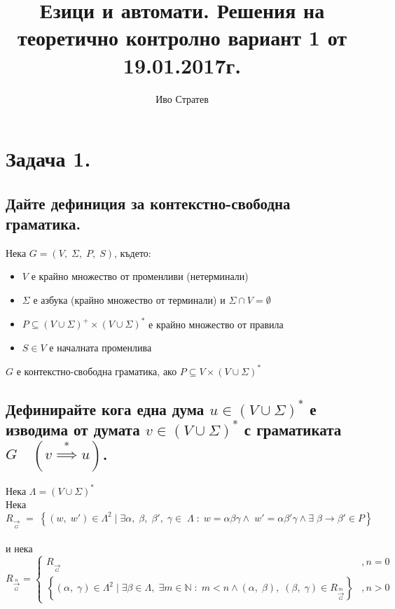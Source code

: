 \documentclass[12pt]{article}
\title{Езици и автомати. Решения на теоретично контролно вариант 1 от 19.01.2017г.}
\author{Иво Стратев}
\newcommand{\N}{\mathbb{N}}
\begin{document}
\maketitle
\section{Задача 1.}

\subsection{Дайте дефиниция за контекстно-свободна граматика.}

Нека $G = (V, \; \Sigma, \; P, \; S)$, където: \\

\begin{itemize}
    \item $V$ е крайно множество от променливи (нетерминали)
    \item $\Sigma$ е азбука (крайно множество от терминали) и $\Sigma \cap V = \emptyset$
    \item $P \subseteq (V \cup \Sigma)^+ \times (V \cup \Sigma)^*$ е крайно множество от правила
    \item $S \in V$ е началната променлива
\end{itemize}

$G$ е контекстно-свободна граматика, ако $P \subseteq V \times (V \cup \Sigma)^*$

\subsection{Дефинирайте кога една дума $u \in (V \cup \Sigma)^*$ е изводима от думата $v \in (V \cup \Sigma)^*$ с граматиката $G \quad (v \overset{*}{\implies} u)$.}

Нека $\Lambda = (V \cup \Sigma)^*$ \\

Нека $R_{\underset{G}{\to}} \; = \; \left\{(w, \; w') \in \Lambda^2 \; | \; \exists \alpha, \; \beta, \; \beta', \; \gamma \in  \; \Lambda \; : \;
w = \alpha\beta\gamma \land \; w' = \alpha\beta'\gamma \land \exists \; \beta \to \beta' \in P\right\}$ \\\\

и нека $R_{\overset{n}{\underset{G}{\to}}} = \begin{cases}
    R_{\underset{G}{\to}} & , n = 0 \\
    \left\{(\alpha, \; \gamma) \in \Lambda^2\; | \; \exists \beta \in \Lambda, \; \exists m \in \N \; : \; m < n \land (\alpha, \; \beta), \; (\beta, \; \gamma) \in R_{\overset{m}{\underset{G}{\to}}}\right\} & , n > 0
\end{cases}$ \\\\
\end{document}
